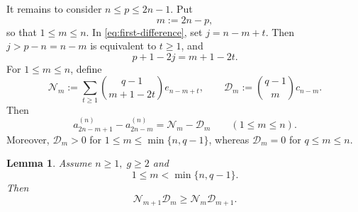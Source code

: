 \documentclass[12pt]{amsart}
\theoremstyle{plain}
\newtheorem{lemma}[theorem]{Lemma}
\theoremstyle{definition}
\theoremstyle{remark}
\begin{document}
It remains to consider \(n\le p\le2n-1\).  Put
\[
 m:=2n-p,
\]
so that \(1\le m\le n\).  In \eqref{eq:first-difference}, set
\(j=n-m+t\).  Then \(j>p-n=n-m\) is equivalent to \(t\ge1\), and
\[
 p+1-2j=m+1-2t.
\]
For \(1\le m\le n\), define
\begin{equation}\label{eq:ND-definition}
 \mathcal N_m
 :=
 \sum_{t\ge1}
 \binom{q-1}{m+1-2t}e_{n-m+t},
 \qquad
 \mathcal D_m
 :=
 \binom{q-1}{m}c_{n-m}.
\end{equation}
Then
\begin{equation}\label{eq:tail-difference}
 a_{2n-m+1}^{(n)}-a_{2n-m}^{(n)}
 =\mathcal N_m-\mathcal D_m
 \qquad(1\le m\le n).
\end{equation}
Moreover, \(\mathcal D_m>0\) for
\(1\le m\le\min\{n,q-1\}\), whereas \(\mathcal D_m=0\) for
\(q\le m\le n\).

\begin{lemma}\label{lem:ND-ratio}
Assume \(n\ge 1,\;g\ge2\) and
\[
 1\le m<\min\{n,q-1\}.
\]
Then
\begin{equation}\label{eq:ND-ratio}
 \mathcal N_{m+1}\mathcal D_m
 \ge
 \mathcal N_m\mathcal D_{m+1}.
\end{equation}
\end{lemma}
\end{document}
